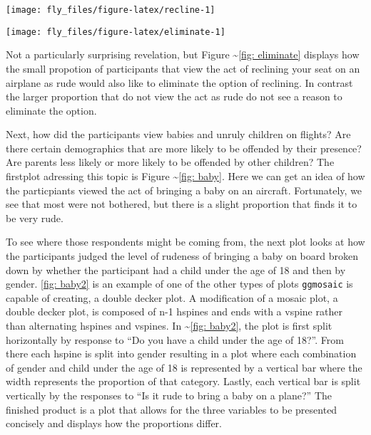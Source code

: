 \begin{Schunk}


\begin{center}\texttt{[image: fly\_files/figure-latex/recline-1]} \end{center}

\end{Schunk}

\begin{Schunk}


\begin{center}\texttt{[image: fly\_files/figure-latex/eliminate-1]} \end{center}

\end{Schunk}

Not a particularly surprising revelation, but Figure
\textasciitilde{}\ref{fig: eliminate} displays how the small propotion
of participants that view the act of reclining your seat on an airplane
as rude would also like to eliminate the option of reclining. In
contrast the larger proportion that do not view the act as rude do not
see a reason to eliminate the option.

Next, how did the participants view babies and unruly children on
flights? Are there certain demographics that are more likely to be
offended by their presence? Are parents less likely or more likely to be
offended by other children? The firstplot adressing this topic is Figure
\textasciitilde{}\ref{fig: baby}. Here we can get an idea of how the
particpiants viewed the act of bringing a baby on an aircraft.
Fortunately, we see that most were not bothered, but there is a slight
proportion that finds it to be very rude.

To see where those respondents might be coming from, the next plot looks
at how the participants judged the level of rudeness of bringing a baby
on board broken down by whether the participant had a child under the
age of 18 and then by gender. \ref{fig: baby2} is an example of one of
the other types of plots \texttt{ggmosaic} is capable of creating, a
double decker plot. A modification of a mosaic plot, a double decker
plot, is composed of n-1 hspines and ends with a vspine rather than
alternating hspines and vspines. In \textasciitilde{}\ref{fig: baby2},
the plot is first split horizontally by response to ``Do you have a
child under the age of 18?''. From there each hspine is split into
gender resulting in a plot where each combination of gender and child
under the age of 18 is represented by a vertical bar where the width
represents the proportion of that category. Lastly, each vertical bar is
split vertically by the responses to ``Is it rude to bring a baby on a
plane?'' The finished product is a plot that allows for the three
variables to be presented concisely and displays how the proportions
differ.

